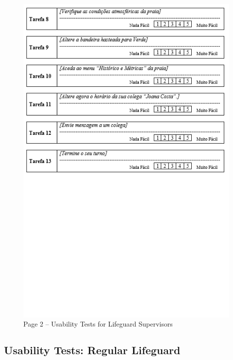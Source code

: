 \begin{figure}[H]
  \centering
  \includegraphics[width=14cm]{figs/UsabilityTest_Supervisor_2.png}
  \caption{Page 2 – Usability Tests for Lifeguard Supervisors}
  \label{fig:UsabilityTest_Supervisor_2}
\end{figure}

\clearpage
\subsection{Usability Tests: Regular Lifeguard}
\label{section:task_regular_lifeguard}

